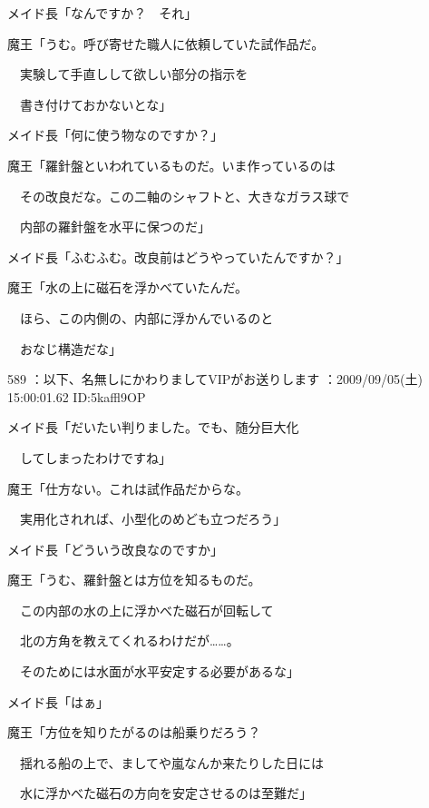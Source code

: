 \documentclass[a4j,twocolumn]{tarticle}
\begin{document}
メイド長「なんですか？　それ」 



魔王「うむ。呼び寄せた職人に依頼していた試作品だ。\par{} 
　実験して手直しして欲しい部分の指示を\par{} 
　書き付けておかないとな」 



メイド長「何に使う物なのですか？」 



魔王「羅針盤といわれているものだ。いま作っているのは\par{} 
　その改良だな。この二軸のシャフトと、大きなガラス球で\par{} 
　内部の羅針盤を水平に保つのだ」 



メイド長「ふむふむ。改良前はどうやっていたんですか？」 



魔王「水の上に磁石を浮かべていたんだ。\par{} 
　ほら、この内側の、内部に浮かんでいるのと\par{} 
　おなじ構造だな」 

	
    
    

589 ：以下、名無しにかわりましてVIPがお送りします ：2009/09/05(土) 15:00:01.62 ID:5kaffl9OP 


メイド長「だいたい判りました。でも、随分巨大化\par{} 
　してしまったわけですね」 



魔王「仕方ない。これは試作品だからな。\par{} 
　実用化されれば、小型化のめども立つだろう」 



メイド長「どういう改良なのですか」 



魔王「うむ、羅針盤とは方位を知るものだ。\par{} 
　この内部の水の上に浮かべた磁石が回転して\par{} 
　北の方角を教えてくれるわけだが……。\par{} 
　そのためには水面が水平安定する必要があるな」 



メイド長「はぁ」 



魔王「方位を知りたがるのは船乗りだろう？\par{} 
　揺れる船の上で、ましてや嵐なんか来たりした日には\par{} 
　水に浮かべた磁石の方向を安定させるのは至難だ」 
\end{document}
